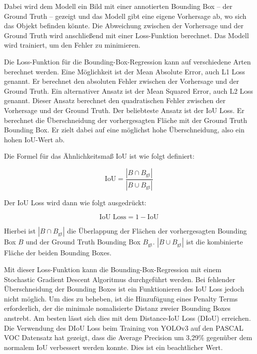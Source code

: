 Dabei wird dem Modell ein Bild mit einer annotierten Bounding Box – der Ground Truth – gezeigt und das Modell gibt eine eigene Vorhersage ab, wo sich das Objekt befinden könnte. Die Abweichung zwischen der Vorhersage und der Ground Truth wird anschließend mit einer Loss-Funktion berechnet. Das Modell wird trainiert, um den Fehler zu minimieren. \cite{BoundingBoxRegression}

Die Loss-Funktion für die Bounding-Box-Regression kann auf verschiedene Arten berechnet werden. Eine Möglichkeit ist der Mean Absolute Error, auch L1 Loss genannt. Er berechnet den absoluten Fehler zwischen der Vorhersage und der Ground Truth. Ein alternativer Ansatz ist der Mean Squared Error, auch L2 Loss genannt. Dieser Ansatz berechnet den quadratischen Fehler zwischen der Vorhersage und der Ground Truth. \cite{fastrcnn}
Der beliebteste Ansatz ist der \ac{IoU} Loss. Er berechnet die Überschneidung der vorhergesagten Fläche mit der Ground Truth Bounding Box. Er zielt dabei auf eine möglichst hohe Überschneidung, also ein hohen \ac{IoU}-Wert ab. \cite{BoundingBoxRegression}

Die Formel für das Ähnlichkeitsmaß \ac{IoU} ist wie folgt definiert:

\[
\text{IoU} = \frac{|B \cap B_{\text{gt}}|}{|B \cup B_{\text{gt}}|}
\]

Der \ac{IoU} Loss wird dann wie folgt ausgedrückt:

\[
\text{IoU Loss} = 1 - \text{IoU}
\]

Hierbei ist \(|B \cap B_{\text{gt}}|\) die Überlappung der Flächen der vorhergesagten Bounding Box \(B\) und der Ground Truth Bounding Box \(B_{\text{gt}}\). \(|B \cup B_{\text{gt}}|\) ist die kombinierte Fläche der beiden Bounding Boxes. \cite{BoundingBoxRegression}

Mit dieser Loss-Funktion kann die Bounding-Box-Regression mit einem Stochastic Gradient Descent Algoritmus durchgeführt werden. Bei fehlender Überschneidung der Bounding Boxes ist ein Funktionieren des \ac{IoU} Loss jedoch nicht möglich. Um dies zu beheben, ist die Hinzufügung eines Penalty Terms erforderlich, der die minimale nomalisierte Distanz zweier Bounding Boxes anstrebt. Am besten lässt sich dies mit dem Distance-IoU Loss (DIoU) erreichen. Die Verwendung des DIoU Loss beim Training von YOLOv3 auf den PASCAL VOC Datensatz hat gezeigt, dass die Average Precision um 3,29\% gegenüber dem normalem \ac{IoU} verbessert werden konnte. Dies ist ein beachtlicher Wert. \cite{BoundingBoxRegression}

